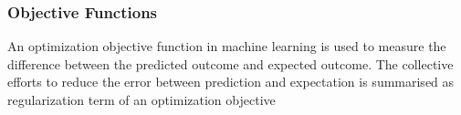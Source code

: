 \subsubsection{Objective Functions}
An optimization objective function in machine learning is used to measure the difference between the predicted outcome and expected outcome. The collective efforts to reduce the error between prediction and expectation is summarised as regularization term of an optimization objective